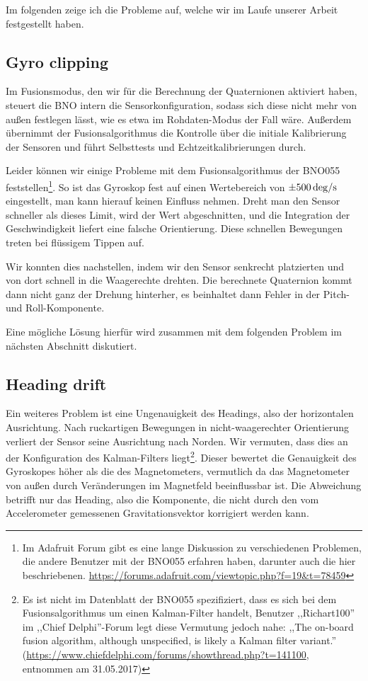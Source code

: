 Im folgenden zeige ich die Probleme auf, welche wir im Laufe unserer Arbeit festgestellt
haben.

\subsection{Gyro clipping}

Im Fusionsmodus, den wir für die Berechnung der Quaternionen aktiviert haben,
steuert die BNO intern die Sensorkonfiguration, sodass sich diese nicht mehr
von außen festlegen lässt, wie es etwa im Rohdaten-Modus der Fall wäre.
Außerdem übernimmt der Fusionsalgorithmus die Kontrolle über die initiale
Kalibrierung der Sensoren und führt Selbsttests und Echtzeitkalibrierungen
durch.

Leider können wir einige Probleme mit dem Fusionsalgorithmus der BNO055
feststellen\footnote{Im Adafruit Forum gibt es eine lange Diskussion zu
verschiedenen Problemen, die andere Benutzer mit der BNO055 erfahren haben,
darunter auch die hier beschriebenen.
\url{https://forums.adafruit.com/viewtopic.php?f=19&t=78459}}. So ist das
Gyroskop fest auf einen Wertebereich von $\SI{\pm500}{deg/s}$ eingestellt, man
kann hierauf keinen Einfluss nehmen. Dreht man den Sensor schneller als dieses
Limit, wird der Wert abgeschnitten, und die Integration der Geschwindigkeit
liefert eine falsche Orientierung. Diese schnellen Bewegungen treten bei
flüssigem Tippen auf.

Wir konnten dies nachstellen, indem wir den Sensor senkrecht platzierten und
von dort schnell in die Waagerechte drehten. Die berechnete Quaternion kommt
dann nicht ganz der Drehung hinterher, es beinhaltet dann Fehler in der Pitch-
und Roll-Komponente.

Eine mögliche Lösung hierfür wird zusammen mit dem folgenden Problem im
nächsten Abschnitt diskutiert.

\subsection{Heading drift}

Ein weiteres Problem ist eine Ungenauigkeit des Headings, also der horizontalen
Ausrichtung. Nach ruckartigen Bewegungen in nicht-waagerechter Orientierung
verliert der Sensor seine Ausrichtung nach Norden. Wir vermuten, dass dies an
der Konfiguration des Kalman-Filters liegt\footnote{Es ist nicht im Datenblatt
der BNO055 spezifiziert, dass es sich bei dem Fusionsalgorithmus um einen
Kalman-Filter handelt, Benutzer ,,Richart100'' im ,,Chief Delphi''-Forum legt
diese Vermutung jedoch nahe: ,,The on-board fusion algorithm, although
unspecified, is likely a Kalman filter variant.''
(\url{https://www.chiefdelphi.com/forums/showthread.php?t=141100}, entnommen am
31.05.2017)}. Dieser bewertet die Genauigkeit des Gyroskopes höher als die des
Magnetometers, vermutlich da das Magnetometer von außen durch Veränderungen im
Magnetfeld beeinflussbar ist. Die Abweichung betrifft nur das Heading, also die
Komponente, die nicht durch den vom Accelerometer gemessenen Gravitationsvektor
korrigiert werden kann.

